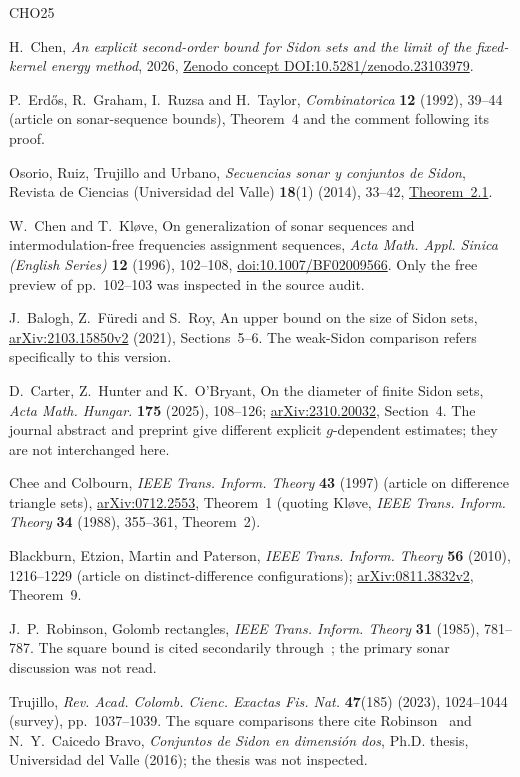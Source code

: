 \documentclass[10pt]{article}
\numberwithin{equation}{section}
\theoremstyle{remark}
\begin{document}
\begin{thebibliography}{CHO25}\footnotesize\raggedright\setlength{\itemsep}{0.5pt}
 H.~Chen, \emph{An explicit second-order bound for
Sidon sets and the limit of the fixed-kernel energy method}, 2026,
\href{https://doi.org/10.5281/zenodo.23103979}{Zenodo concept DOI:10.5281/zenodo.23103979}.

 P.~Erd\H{o}s, R.~Graham, I.~Ruzsa and H.~Taylor,
\emph{Combinatorica} \textbf{12} (1992), 39--44
(article on sonar-sequence bounds),
Theorem~4 and the comment following its proof.

 Osorio, Ruiz, Trujillo and Urbano,
\emph{Secuencias sonar y conjuntos de Sidon},
Revista de Ciencias (Universidad del Valle) \textbf{18}(1) (2014), 33--42,
\href{http://www.scielo.org.co/pdf/rcien/v18n1/v18n1a03.pdf}{Theorem~2.1}.

 W.~Chen and T.~Kl\o ve,
On generalization of sonar sequences and intermodulation-free frequencies
assignment sequences, \emph{Acta Math. Appl. Sinica (English Series)}
\textbf{12} (1996), 102--108,
\href{https://doi.org/10.1007/BF02009566}{doi:10.1007/BF02009566}.
Only the free preview of pp.~102--103 was inspected in the source audit.

 J.~Balogh, Z.~F\"uredi and S.~Roy,
An upper bound on the size of Sidon sets,
\href{https://arxiv.org/abs/2103.15850v2}{arXiv:2103.15850v2} (2021),
Sections~5--6. The weak-Sidon comparison refers specifically to this version.

 D.~Carter, Z.~Hunter and K.~O'Bryant,
On the diameter of finite Sidon sets,
\emph{Acta Math. Hungar.} \textbf{175} (2025), 108--126;
\href{https://arxiv.org/abs/2310.20032}{arXiv:2310.20032}, Section~4.
The journal abstract and preprint give different explicit
$g$-dependent estimates; they are not interchanged here.

 Chee and Colbourn,
\emph{IEEE Trans. Inform. Theory} \textbf{43} (1997)
(article on difference triangle sets),
\href{https://arxiv.org/abs/0712.2553}{arXiv:0712.2553}, Theorem~1
(quoting Kl\o ve, \emph{IEEE Trans. Inform. Theory} \textbf{34}
(1988), 355--361, Theorem~2).

 Blackburn, Etzion, Martin and Paterson,
\emph{IEEE Trans. Inform. Theory} \textbf{56} (2010), 1216--1229
(article on distinct-difference configurations);
\href{https://arxiv.org/abs/0811.3832v2}{arXiv:0811.3832v2}, Theorem~9.

 J.~P.~Robinson, Golomb rectangles,
\emph{IEEE Trans. Inform. Theory} \textbf{31} (1985), 781--787.
The square bound is cited secondarily through~\cite{Tru23};
the primary sonar discussion was not read.

 Trujillo,
\emph{Rev. Acad. Colomb. Cienc. Exactas Fis. Nat.} \textbf{47}(185)
(2023), 1024--1044 (survey), pp.~1037--1039.
The square comparisons there cite Robinson~\cite{Rob85} and
N.~Y.~Caicedo Bravo, \emph{Conjuntos de Sidon en dimensi\'on dos},
Ph.D. thesis, Universidad del Valle (2016); the thesis was not inspected.
\end{thebibliography}
\end{document}

